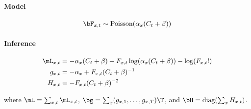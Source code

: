 \paragraph{Model}

\begin{align}
	\bF_{x,t} \sim \text{Poisson}(\alpha_x (C_t + \beta))
\end{align}

\paragraph{Inference}

\begin{subequations} 
\begin{align}
\mL_{x,t} &= -\alpha_x (C_t + \beta) + F_{x,t} \log(\alpha_x(C_t + \beta)) - \log(F_{x,t}!)  \\
g_{x,t} &= -\alpha_x + F_{x,t}(C_t + \beta)^{-1} \\
H_{x,t} &= -F_{x,t} (C_t + \beta)^{-2}
\end{align}
\end{subequations}

\noindent where $\mL=\sum_{x,t} \mL_{x,t}$, $\bg=\sum_x (g_{x,1}, \ldots, g_{x,T})\T$, and $\bH=\text{diag}(\sum_x H_{x,t})$.